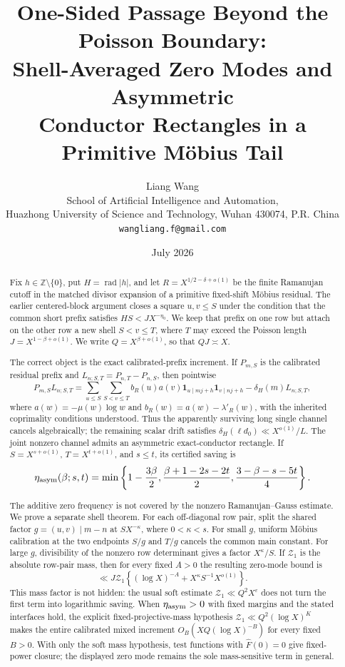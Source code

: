 \documentclass[11pt]{article}
\title{\textbf{One-Sided Passage Beyond the Poisson Boundary:}\\
\textbf{Shell-Averaged Zero Modes and Asymmetric}\\
\textbf{Conductor Rectangles in a Primitive M\"obius Tail}}
\author{Liang Wang\\
\small School of Artificial Intelligence and Automation,\\[-0.2em]
\small Huazhong University of Science and Technology, Wuhan 430074, P.R. China\\
\small \texttt{wangliang.f@gmail.com}}
\date{July 2026}
\theoremstyle{definition}
\theoremstyle{remark}
\newcommand{\one}{\mathbf 1}
\begin{document}
\maketitle

\begin{abstract}
Fix \(h\in\mathbb Z\setminus\{0\}\), put \(H=\operatorname{rad}|h|\),
and let \(R=X^{1/2-\delta+o(1)}\) be the finite Ramanujan cutoff in the
matched divisor expansion of a primitive fixed-shift M\"obius
residual.  The earlier centered-block argument closes a square
\(u,v\le S\) under the condition that the common short prefix satisfies
\(HS<JX^{-\eta_0}\).  We keep that prefix on one row but attach on the
other row a new shell \(S<v\le T\), where \(T\) may exceed the
Poisson length \(J=X^{1-\beta+o(1)}\).  We write
\(Q=X^{\beta+o(1)}\), so that \(QJ\asymp X\).

The correct object is the exact calibrated-prefix increment.  If
\(P_{m,S}\) is the calibrated residual prefix and
\(L_{n;S,T}=P_{n,T}-P_{n,S}\), then pointwise
\[
 P_{m,S}L_{n;S,T}
 =\sum_{u\le S}\sum_{S<v\le T}
 b_R(u)a(v)\one_{u\mid mj+h}\one_{v\mid nj+h}
 -\delta_H(m)L_{n;S,T},
\]
where \(a(w)=-\mu(w)\log w\) and
\(b_R(w)=a(w)-\lambda'_R(w)\), with the inherited coprimality
conditions understood.  Thus the
apparently surviving long single channel cancels algebraically; the
remaining scalar drift satisfies
\(\delta_H(\ell d_0)\ll X^{o(1)}/L\).  The joint nonzero channel admits
an asymmetric exact-conductor rectangle.  If \(S=X^{s+o(1)}\),
\(T=X^{t+o(1)}\), and \(s\le t\), its certified saving is
\[
 \eta_{\rm asym}(\beta;s,t)=
 \min\left\{
 1-\frac{3\beta}{2},
 \frac{\beta+1-2s-2t}{2},
 \frac{3-\beta-s-5t}{4}
 \right\}.
\]

The additive zero frequency is not covered by the nonzero
Ramanujan--Gauss estimate.  We prove a separate shell theorem.  For
each off-diagonal row pair, split the shared factor
\(g=(u,v)\mid m-n\) at \(SX^{-\kappa}\), where \(0<\kappa<s\).
For small \(g\), uniform M\"obius calibration at the two endpoints
\(S/g\) and \(T/g\) cancels the common main constant.  For large
\(g\), divisibility of the nonzero row determinant gives a factor
\(X^\kappa/S\).  If \(\mathcal Z_1\) is the absolute row-pair mass,
then for every fixed \(A>0\) the resulting zero-mode bound is
\[
 \ll J\mathcal Z_1
 \left\{(\log X)^{-A}+X^\kappa S^{-1}X^{o(1)}\right\}.
\]
This mass factor is not hidden: the usual soft estimate
\(\mathcal Z_1\ll Q^2X^\varepsilon\) does not turn the first term into
logarithmic saving.  When \(\eta_{\rm asym}>0\) with fixed margins and
the stated interfaces hold, the explicit fixed-projective-mass
hypothesis \(\mathcal Z_1\ll Q^2(\log X)^K\) makes the entire
calibrated mixed increment
\(O_B(XQ(\log X)^{-B})\) for every fixed \(B>0\).  With only the soft
mass hypothesis, test functions with \(\widehat F(0)=0\) give
fixed-power closure; the displayed zero mode remains the sole
mass-sensitive term in general.


\end{abstract}
\end{document}

